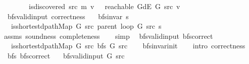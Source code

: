 \begin{isabellebody}
\ \ \ \ \ \ \ {\isacharparenleft}{\kern0pt}{\isasymnot}\ is{\isacharunderscore}{\kern0pt}discovered\ src\ m\ v\ {\isasymlongrightarrow}\ {\isasymnot}\ reachable\ {\isacharparenleft}{\kern0pt}G{\isachardot}{\kern0pt}dE\ G{\isacharparenright}{\kern0pt}\ src\ v{\isacharparenright}{\kern0pt}{\isachardoublequoteclose}\isanewline
\isanewline
{}\isamarkupfalse%
\ {\isacharparenleft}{\kern0pt}\ bfs{\isacharunderscore}{\kern0pt}valid{\isacharunderscore}{\kern0pt}input{\isacharparenright}{\kern0pt}\ correctness{\isacharcolon}{\kern0pt}\isanewline
\ \ \ {\isachardoublequoteopen}bfs{\isacharunderscore}{\kern0pt}invar{\isacharprime}{\kern0pt}{\isacharprime}{\kern0pt}\ s{\isachardoublequoteclose}\isanewline
\ \ \ {\isachardoublequoteopen}is{\isacharunderscore}{\kern0pt}shortest{\isacharunderscore}{\kern0pt}dpath{\isacharunderscore}{\kern0pt}Map\ G\ src\ {\isacharparenleft}{\kern0pt}parent\ {\isacharparenleft}{\kern0pt}loop\ G\ src\ s{\isacharparenright}{\kern0pt}{\isacharparenright}{\kern0pt}{\isachardoublequoteclose}\isanewline
%
\isadelimproof
\ \ %
\endisadelimproof
%
\isatagproof
{}\isamarkupfalse%
\ assms\ soundness\ completeness\isanewline
\ \ \isamarkupfalse%
\ simp%
\endisatagproof
{\isafoldproof}%
%
\isadelimproof
\isanewline
%
\endisadelimproof
\isanewline
{}\isamarkupfalse%
\ {\isacharparenleft}{\kern0pt}\ bfs{\isacharunderscore}{\kern0pt}valid{\isacharunderscore}{\kern0pt}input{\isacharparenright}{\kern0pt}\ bfs{\isacharunderscore}{\kern0pt}correct{\isacharcolon}{\kern0pt}\isanewline
\ \ \ {\isachardoublequoteopen}is{\isacharunderscore}{\kern0pt}shortest{\isacharunderscore}{\kern0pt}dpath{\isacharunderscore}{\kern0pt}Map\ G\ src\ {\isacharparenleft}{\kern0pt}bfs\ G\ src{\isacharparenright}{\kern0pt}{\isachardoublequoteclose}\isanewline
%
\isadelimproof
\ \ %
\endisadelimproof
%
\isatagproof
{}\isamarkupfalse%
\ bfs{\isacharunderscore}{\kern0pt}invar{\isacharunderscore}{\kern0pt}init\isanewline
\ \ \isamarkupfalse%
\ {\isacharparenleft}{\kern0pt}intro\ correctness{\isacharparenright}{\kern0pt}%
\endisatagproof
{\isafoldproof}%
%
\isadelimproof
\isanewline
%
\endisadelimproof
\isanewline
{}\isamarkupfalse%
\ {\isacharparenleft}{\kern0pt}\ bfs{\isacharparenright}{\kern0pt}\ bfs{\isacharunderscore}{\kern0pt}correct{\isacharcolon}{\kern0pt}\isanewline
\ \ \ {\isachardoublequoteopen}bfs{\isacharunderscore}{\kern0pt}valid{\isacharunderscore}{\kern0pt}input{\isacharprime}{\kern0pt}\ G\ src{\isachardoublequoteclose}\isanewline

\end{isabellebody}
